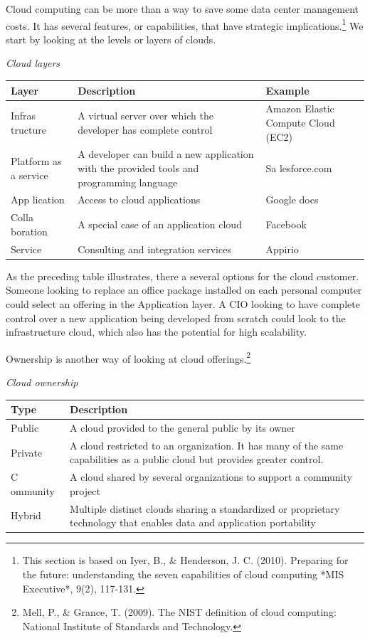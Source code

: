 \documentclass[
]{article}
\begin{document}
Cloud computing can be more than a way to save some data center
management costs. It has several features, or capabilities, that have
strategic implications.\footnote{This section is based on Iyer, B., \& Henderson, J.
  C. (2010). Preparing for the future: understanding the seven
  capabilities of cloud computing *MIS Executive*, 9(2), 117-131.} We start by looking at the
levels or layers of clouds.

\emph{Cloud layers}

\begin{longtable}[]{@{}
  >{\raggedright\arraybackslash}p{}
  >{\raggedright\arraybackslash}p{}
  >{\raggedright\arraybackslash}p{}@{}}
\toprule
Layer & Description & Example \\
\midrule
\endhead
Infras
tructure & A virtual server over which the
developer has complete control & Amazon
Elastic
Compute
Cloud (EC2) \\
Platform as
a service & A developer can build a new
application with the provided tools
and programming language & Sa
lesforce.com \\
App lication & Access to cloud applications & Google docs \\
Colla
boration & A special case of an application
cloud & Facebook \\
Service & Consulting and integration services & Appirio \\
\bottomrule
\end{longtable}

As the preceding table illustrates, there a several options for the
cloud customer. Someone looking to replace an office package installed
on each personal computer could select an offering in the Application
layer. A CIO looking to have complete control over a new application
being developed from scratch could look to the infrastructure cloud,
which also has the potential for high scalability.

Ownership is another way of looking at cloud
offerings.\footnote{Mell, P., \& Grance, T. (2009). The NIST definition
  of cloud computing: National Institute of Standards and Technology.}

\emph{Cloud ownership}

\begin{longtable}[]{@{}
  >{\raggedright\arraybackslash}p{}
  >{\raggedright\arraybackslash}p{}@{}}
\toprule
Type & Description \\
\midrule
\endhead
Public & A cloud provided to the general public by its owner \\
Private & A cloud restricted to an organization. It has many of the
same capabilities as a public cloud but provides greater
control. \\
C
ommunity & A cloud shared by several organizations to support a
community project \\
Hybrid & Multiple distinct clouds sharing a standardized or
proprietary technology that enables data and application
portability \\
\bottomrule
\end{longtable}
\end{document}
